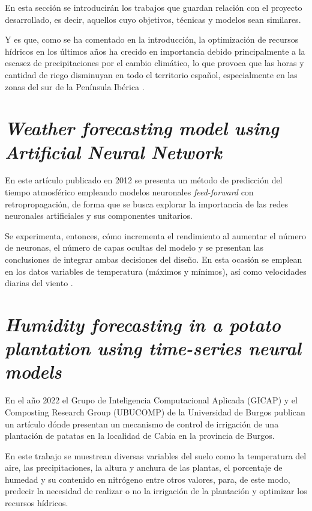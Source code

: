 
En esta sección se introducirán los trabajos que guardan relación con el proyecto desarrollado,
es decir, aquellos cuyo objetivos, técnicas y modelos sean similares.

Y es que, como se ha comentado en la introducción, la optimización de recursos hídricos en los 
últimos años ha crecido en importancia debido principalmente a la escasez de precipitaciones
por el cambio climático, lo que provoca que las horas y cantidad de riego disminuyan en todo el territorio
español, especialmente en las zonas del sur de la Península Ibérica \cite{misc:PNR,misc:PNRdemanda}.

\section{\textit{Weather forecasting model using Artificial Neural Network}}
En este artículo publicado en 2012 se presenta un método de predicción del tiempo atmosférico
empleando modelos neuronales \textit{feed-forward} con retropropagación, de forma que se busca
explorar la importancia de las redes neuronales artificiales y sus componentes unitarios.

Se experimenta, entonces, cómo incrementa el rendimiento al aumentar el número de neuronas,
el número de capas ocultas del modelo y se presentan las conclusiones de integrar ambas decisiones
del diseño. En esta ocasión se emplean en los datos variables de temperatura (máximos y 
mínimos), así como velocidades diarias del viento \cite{ABHISHEK2012311}.

\section{\textit{Humidity forecasting in a potato plantation using time-series neural models}}
En el año 2022 el Grupo de Inteligencia Computacional Aplicada (GICAP) y el Composting Research Group
(UBUCOMP) de la Universidad de Burgos publican un artículo dónde presentan un mecanismo de control
de irrigación de una plantación de patatas en la localidad de Cabia en la provincia de Burgos.

En este trabajo se muestrean diversas variables del suelo como la temperatura del aire,
las precipitaciones, la altura y anchura de las plantas, el porcentaje de humedad y su contenido
en nitrógeno entre otros valores, para, de este modo, predecir la necesidad de realizar o no la
irrigación de la plantación y optimizar los recursos hídricos.

